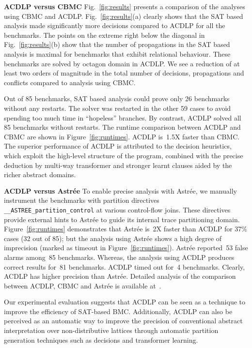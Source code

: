 

%
\noindent \textbf{ACDLP versus CBMC}
Fig.~\ref{fig:results} presents a comparison of the analyses using CBMC
and ACDLP.  Fig.~\ref{fig:results}(a) clearly shows that the SAT based analysis 
made significantly more decisions compared to ACDLP for all the benchmarks. 
The points on the extreme right below the diagonal in
Fig.~\ref{fig:results}(b) show that the number of propagations in the SAT based 
analysis is maximal for benchmarks that exhibit relational behaviour.  These
benchmarks are solved by octagon domain in ACDLP.  We see a reduction of at 
least two orders of magnitude in the total number of decisions, propagations 
and conflicts compared to analysis using CBMC.  

Out of 85 benchmarks, SAT based analysis could prove only 26
benchmarks without any restarts.  The solver was restarted in the other 59 
cases to avoid spending too much time in ``hopeless'' branches.  By contrast, 
ACDLP solved all 85 benchmarks without restarts.  
The runtime comparison between ACDLP and CBMC are shown in 
Figure~\ref{fig:runtimes}.  ACDLP is~1.5X faster than CBMC. 
The superior performance of ACDLP is attributed to the decision heuristics, 
which exploit the high-level structure of the program, combined with the 
precise deduction by multi-way transformer and stronger learnt clauses aided 
by the richer abstract domains. 
%


\noindent \textbf{ACDLP versus Astr{\'e}e}
%
To enable precise analysis with Astr{\'e}e, we manually instrument 
the benchmarks with partition directives \texttt{\_\_ASTREE\_partition\_control} 
at various control-flow joins.  These directives provide external hints to
Astr{\'e}e to guide its internal trace partitioning domain. 
Figure~\ref{fig:runtimes} demonstrates that Astr{\'e}e is~2X faster 
than ACDLP for {37}\% cases (32 out of 85); but the analysis using 
Astr{\'e}e shows a high degree of imprecision (marked as timeout in 
Figure~\ref{fig:runtimes}).  Astr{\'e}e reported~53 false alarms 
among~85 benchmarks.  Whereas, the analysis using ACDLP produces correct 
results for~81 benchmarks.  ACDLP timed out for~4 benchmarks. Clearly, ACDLP has higher precision than 
Astr{\'e}e. Detailed analysis of the comparison between ACDLP, CBMC and 
Astr{\'e}e is available at~\cite{extended}.


Our experimental evaluation suggests that ACDLP can be seen as a
technique to improve the efficiency of SAT-based BMC.  Additionally, ACDLP can
also be perceived as an automatic way to improve the precision of conventional
abstract interpretation over non-distributive lattices through automatic partition 
generation techniques such as decisions and transformer learning.
